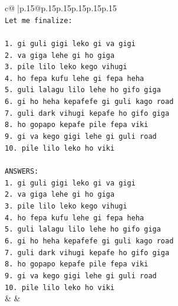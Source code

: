 \documentclass{article}
\begin{document}
{\begin{supertabular}{c@{$\;$}|p{.15\linewidth}@{}p{.15\linewidth}p{.15\linewidth}p{.15\linewidth}p{.15\linewidth}p{.15\linewidth}}
{{{\\ 
\texttt{Let me finalize:} \\
\\ 
\texttt{1. gi guli gigi leko gi va gigi} \\
\texttt{2. va giga lehe gi ho giga} \\
\texttt{3. pile lilo leko kego vihugi} \\
\texttt{4. ho fepa kufu lehe gi fepa heha} \\
\texttt{5. guli lalagu lilo lehe ho gifo giga} \\
\texttt{6. gi ho heha kepafefe gi guli kago road} \\
\texttt{7. guli dark vihugi kepafe ho gifo giga} \\
\texttt{8. ho gopapo kepafe pile fepa viki} \\
\texttt{9. gi va kego gigi lehe gi guli road} \\
\texttt{10. pile lilo leko ho viki} \\
\\ 
\texttt{ANSWERS:} \\
\texttt{1. gi guli gigi leko gi va gigi} \\
\texttt{2. va giga lehe gi ho giga} \\
\texttt{3. pile lilo leko kego vihugi} \\
\texttt{4. ho fepa kufu lehe gi fepa heha} \\
\texttt{5. guli lalagu lilo lehe ho gifo giga} \\
\texttt{6. gi ho heha kepafefe gi guli kago road} \\
\texttt{7. guli dark vihugi kepafe ho gifo giga} \\
\texttt{8. ho gopapo kepafe pile fepa viki} \\
\texttt{9. gi va kego gigi lehe gi guli road} \\
\texttt{10. pile lilo leko ho viki} \\
            }
        }
    }
    & & \\ \\


\end{supertabular}}
\end{document}
